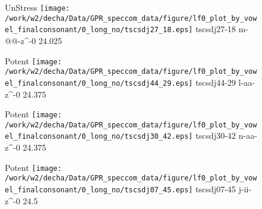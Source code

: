 \documentclass{article}
\begin{document}
\begin{figure}[t]
\begin{minipage}[b]{.24\textwidth}
UnStress
\centering
\texttt{[image: /work/w2/decha/Data/GPR\_speccom\_data/figure/lf0\_plot\_by\_vowel\_finalconsonant/0\_long\_no/tscsdj27\_18.eps]}
tscsdj27-18 m-@@-z\textasciicircum-0 24.025
\end{minipage}
\begin{minipage}[b]{.24\textwidth}
\colorbox{Apricot}{Potent}
\centering
\texttt{[image: /work/w2/decha/Data/GPR\_speccom\_data/figure/lf0\_plot\_by\_vowel\_finalconsonant/0\_long\_no/tscsdj44\_29.eps]}
tscsdj44-29 l-aa-z\textasciicircum-0 24.375
\end{minipage}
\begin{minipage}[b]{.24\textwidth}
\colorbox{Apricot}{Potent}
\centering
\texttt{[image: /work/w2/decha/Data/GPR\_speccom\_data/figure/lf0\_plot\_by\_vowel\_finalconsonant/0\_long\_no/tscsdj30\_42.eps]}
tscsdj30-42 n-aa-z\textasciicircum-0 24.375
\end{minipage}
\begin{minipage}[b]{.24\textwidth}
\colorbox{Apricot}{Potent}
\centering
\texttt{[image: /work/w2/decha/Data/GPR\_speccom\_data/figure/lf0\_plot\_by\_vowel\_finalconsonant/0\_long\_no/tscsdj07\_45.eps]}
tscsdj07-45 j-ii-z\textasciicircum-0 24.5
\end{minipage}
\end{figure}
\end{document}

